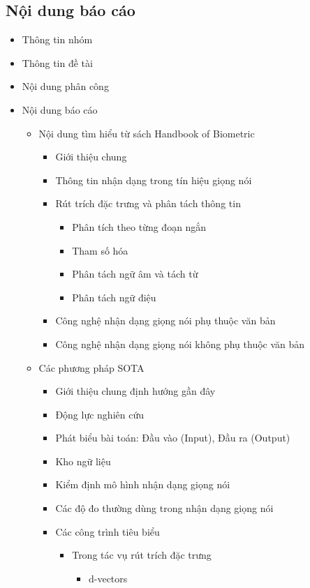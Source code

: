 \documentclass{article}
\begin{document}
	\subsection{Nội dung báo cáo}
	\begin{itemize}
		\item Thông tin nhóm
		\item Thông tin đề tài
		\item Nội dung phân công
		\item Nội dung báo cáo
		\begin{itemize}
			\item Nội dung tìm hiểu từ sách Handbook of Biometric
			\begin{itemize}
				\item Giới thiệu chung
				\item Thông tin nhận dạng trong tín hiệu giọng nói
				\item Rút trích đặc trưng và phân tách thông tin
				\begin{itemize}
					\item Phân tích theo từng đoạn ngắn
					\item Tham số hóa
					\item Phân tách ngữ âm và tách từ
					\item Phân tách ngữ điệu
				\end{itemize}
				\item Công nghệ nhận dạng giọng nói phụ thuộc văn bản
				\item Công nghệ nhận dạng giọng nói không phụ thuộc văn bản
			\end{itemize}
			\item Các phương pháp SOTA
			\begin{itemize}
				\item Giới thiệu chung định hướng gần đây
				\item Động lực nghiên cứu
				\item Phát biểu bài toán: Đầu vào (Input), Đầu ra (Output)
				\item Kho ngữ liệu
				\item Kiểm định mô hình nhận dạng giọng nói
				\item Các độ đo thường dùng trong nhận dạng giọng nói
				\item Các công trình tiêu biểu
				\begin{itemize}
					\item Trong tác vụ rút trích đặc trưng
					\begin{itemize}
						\item d-vectors

\end{itemize}
\end{itemize}
\end{itemize}
\end{itemize}
\end{itemize}
\end{document}
